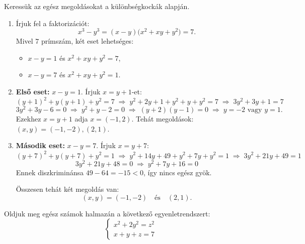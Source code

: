 \begin{solution}
	Keressük az egész megoldásokat a különbségkockák alapján.
	\begin{enumerate}
		\item Írjuk fel a faktorizációt: 
		\[
		x^{3}-y^{3}=(x-y)\bigl(x^{2}+xy+y^{2}\bigr)=7.
		\]
		Mivel $7$ prímszám, két eset lehetséges: 
		\begin{itemize}
			\item $x-y=1$ és $x^{2}+xy+y^{2}=7$, 
			\item $x-y=7$ és $x^{2}+xy+y^{2}=1$. 
		\end{itemize}
		\item \textbf{Első eset:} $x-y=1$. Írjuk $x=y+1$-et: 
		\[
		(y+1)^{2}+y(y+1)+y^{2}=7\;\Longrightarrow\;y^{2}+2y+1+y^{2}+y+y^{2}=7\;\Longrightarrow\;3y^{2}+3y+1=7
		\]
		\[
		3y^{2}+3y-6=0\;\Longrightarrow\;y^{2}+y-2=0\;\Longrightarrow\;(y+2)(y-1)=0\;\Longrightarrow\;y=-2\text{ vagy }y=1.
		\]
		Ezekhez $x=y+1$ adja $x=(-1,2)$. Tehát megoldások: $(x,y)=(-1,-2),(2,1)$.
		\item \textbf{Második eset:} $x-y=7$. Írjuk $x=y+7$: 
		\[
		(y+7)^{2}+y(y+7)+y^{2}=1\;\Longrightarrow\;y^{2}+14y+49+y^{2}+7y+y^{2}=1\;\Longrightarrow\;3y^{2}+21y+49=1
		\]
		\[
		3y^{2}+21y+48=0\;\Longrightarrow\;y^{2}+7y+16=0
		\]
		Ennek diszkriminánsa $49-64=-15<0$, így nincs egész gyök.
		
		Összesen tehát két megoldás van: 
		\[
		\boxed{(x,y)=(-1,-2)\quad\text{és}\quad(2,1)}.
		\]
		
	\end{enumerate}
\end{solution}
\vspace{1em}

\begin{extraproblem}
	Oldjuk meg egész számok halmazán a következő egyenletrendszert: 
	\[
	\begin{cases}
		x^{2}+2y^{2}=z^{2}\\
		x+y+z=7
	\end{cases}
	\]
\end{extraproblem}

\vspace{1em}

